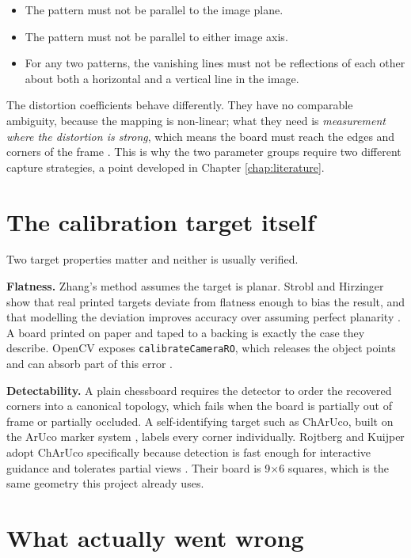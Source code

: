 \begin{itemize}
    \item The pattern must not be parallel to the image plane.
    \item The pattern must not be parallel to either image axis.
    \item For any two patterns, the vanishing lines must not be reflections of each other about both a horizontal and a vertical line in the image.
\end{itemize}

The distortion coefficients behave differently. They have no comparable ambiguity, because the mapping is non-linear; what they need is \emph{measurement where the distortion is strong}, which means the board must reach the edges and corners of the frame \cite{rojtberg2018pose}. This is why the two parameter groups require two different capture strategies, a point developed in Chapter \ref{chap:literature}.

\section{The calibration target itself}

Two target properties matter and neither is usually verified.

\textbf{Flatness.} Zhang's method assumes the target is planar. Strobl and Hirzinger show that real printed targets deviate from flatness enough to bias the result, and that modelling the deviation improves accuracy over assuming perfect planarity \cite{strobl2011imperfect}. A board printed on paper and taped to a backing is exactly the case they describe. OpenCV exposes \texttt{calibrateCameraRO}, which releases the object points and can absorb part of this error \cite{opencv_calib3d}.

\textbf{Detectability.} A plain chessboard requires the detector to order the recovered corners into a canonical topology, which fails when the board is partially out of frame or partially occluded. A self-identifying target such as ChArUco, built on the ArUco marker system \cite{garrido2014aruco}, labels every corner individually. Rojtberg and Kuijper adopt ChArUco specifically because detection is fast enough for interactive guidance and tolerates partial views \cite{rojtberg2018pose}. Their board is 9$\times$6 squares, which is the same geometry this project already uses.

\section{What actually went wrong}
\label{sec:hypothesis}

